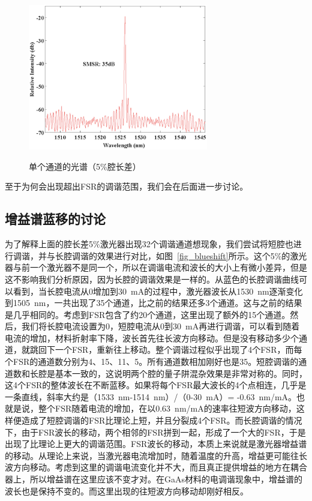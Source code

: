 \documentclass{ZJUthesis}
\begin{document}
\begin{figure}[htbp]
  \centering
  \includegraphics[width=0.7\textwidth]{./Pictures/double_spectrum_32ch.eps}\\
  \caption{单个通道的光谱（5\%腔长差）}
  \label{fig_double_spectrum_32ch}
\end{figure}

至于为何会出现超出FSR的调谐范围，我们会在后面进一步讨论。

\subsection{增益谱蓝移的讨论}

为了解释上面的腔长差5\%激光器出现32个调谐通道想现象，我们尝试将短腔也进行调谐，并与长腔调谐的效果进行对比，如图~\ref{fig_blueshift}所示。这个5\%的激光器与前一个激光器不是同一个，所以在调谐电流和波长的大小上有微小差异，但是这不影响我们分析原因，因为长腔的调谐效果是一样的。从蓝色的长腔调谐曲线可以看到，当长腔电流从0增加到30~mA的过程中，激光器波长从1530~nm逐渐变化到1505~nm，一共出现了35个通道，比之前的结果还多3个通道。这与之前的结果是几乎相同的。考虑到FSR包含了约20个通道，这里出现了额外的15个通道。然后，我们将长腔电流设置为0，短腔电流从0到30~mA再进行调谐，可以看到随着电流的增加，材料折射率下降，波长首先往长波方向移动。但是没有移动多少个通道，就跳回下一个FSR，重新往上移动。整个调谐过程似乎出现了4个FSR，而每个FSR的通道数分别为4、15、11、5。所有通道数相加刚好也是35。短腔调谐的通道数和长腔是基本一致的，这说明两个腔的量子阱混杂效果是非常对称的。同时，这4个FSR的整体波长在不断蓝移。如果将每个FSR最大波长的4个点相连，几乎是一条直线，斜率大约是（1533~nm-1514~nm）/（0-30~mA）= -0.63~nm/mA。也就是说，整个FSR随着电流的增加，在以0.63~nm/mA的速率往短波方向移动，这样便造成了短腔调谐的FSR比理论上短，并且分裂成4个FSR。而长腔调谐的情况下，由于FSR波长的移动，两个相邻的FSR拼到一起，形成了一个大的FSR，于是出现了比理论上更大的调谐范围。FSR波长的移动，本质上来说就是激光器增益谱的移动。从理论上来说，当激光器电流增加时，随着温度的升高，增益更可能往长波方向移动。考虑到这里的调谐电流变化并不大，而且真正提供增益的地方在耦合器上，所以增益谱在这里应该不变才对。在GaAs材料的电调谐现象中，增益谱的波长也是保持不变的\cite{魏文雄2013GaAs}。而这里出现的往短波方向移动却刚好相反。
\end{document}
